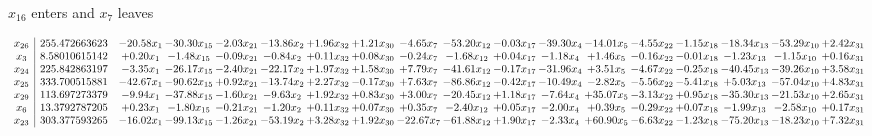 \documentclass[9pt]{article}
\begin{document}
 $ x_{16} $ enters and $ x_{7} $ leaves 

 \[\begin{array}{c| c c@{\hskip 2pt} c@{\hskip 2pt} c@{\hskip 2pt} c@{\hskip 2pt} c@{\hskip 2pt} c@{\hskip 2pt} c@{\hskip 2pt} c@{\hskip 2pt} c@{\hskip 2pt} c@{\hskip 2pt} c@{\hskip 2pt} c@{\hskip 2pt} c@{\hskip 2pt} c@{\hskip 2pt} c@{\hskip 2pt} c@{\hskip 2pt} }
 x_{26}   &  255.472663623 & -20.58 x_{1} & -30.30 x_{15} & -2.03 x_{21} & -13.86 x_{2} & +  1.96 x_{32} & +  1.21 x_{30} & -4.65 x_{7} & -53.20 x_{12} & -0.03 x_{17} & -39.30 x_{4} & -14.01 x_{5} & -4.55 x_{22} & -1.15 x_{18} & -18.34 x_{13} & -53.29 x_{10} & +  2.42 x_{31}\\
 x_{3}   &  8.58010615142 & +  0.20 x_{1} & -1.48 x_{15} & -0.09 x_{21} & -0.84 x_{2} & +  0.11 x_{32} & +  0.08 x_{30} & -0.24 x_{7} & -1.68 x_{12} & +  0.04 x_{17} & -1.18 x_{4} & +  1.46 x_{5} & -0.16 x_{22} & -0.01 x_{18} & -1.23 x_{13} & -1.15 x_{10} & +  0.16 x_{31}\\
 x_{24}   &  225.842863197 & -3.35 x_{1} & -26.17 x_{15} & -2.40 x_{21} & -22.17 x_{2} & +  1.97 x_{32} & +  1.58 x_{30} & +  7.79 x_{7} & -41.61 x_{12} & -0.17 x_{17} & -31.96 x_{4} & +  3.51 x_{5} & -4.67 x_{22} & -0.25 x_{18} & -40.45 x_{13} & -39.26 x_{10} & +  3.58 x_{31}\\
 x_{25}   &  333.700515881 & -42.67 x_{1} & -90.62 x_{15} & +  0.92 x_{21} & -13.74 x_{2} & +  2.27 x_{32} & -0.17 x_{30} & +  7.63 x_{7} & -86.86 x_{12} & -0.42 x_{17} & -10.49 x_{4} & -2.82 x_{5} & -5.56 x_{22} & -5.41 x_{18} & +  5.03 x_{13} & -57.04 x_{10} & +  4.83 x_{31}\\
 x_{29}   &  113.697273379 & -9.94 x_{1} & -37.88 x_{15} & -1.60 x_{21} & -9.63 x_{2} & +  1.92 x_{32} & +  0.83 x_{30} & +  3.00 x_{7} & -20.45 x_{12} & +  1.18 x_{17} & -7.64 x_{4} & + 35.07 x_{5} & -3.13 x_{22} & +  0.95 x_{18} & -35.30 x_{13} & -21.53 x_{10} & +  2.65 x_{31}\\
 x_{6}   &  13.3792787205 & +  0.23 x_{1} & -1.80 x_{15} & -0.21 x_{21} & -1.20 x_{2} & +  0.11 x_{32} & +  0.07 x_{30} & +  0.35 x_{7} & -2.40 x_{12} & +  0.05 x_{17} & -2.00 x_{4} & +  0.39 x_{5} & -0.29 x_{22} & +  0.07 x_{18} & -1.99 x_{13} & -2.58 x_{10} & +  0.17 x_{31}\\
 x_{23}   &  303.377593265 & -16.02 x_{1} & -99.13 x_{15} & -1.26 x_{21} & -53.19 x_{2} & +  3.28 x_{32} & +  1.92 x_{30} & -22.67 x_{7} & -61.88 x_{12} & +  1.90 x_{17} & -2.33 x_{4} & + 60.90 x_{5} & -6.63 x_{22} & -1.23 x_{18} & -75.20 x_{13} & -18.23 x_{10} & +  7.32 x_{31}\\

\end{array}\]
\end{document}
